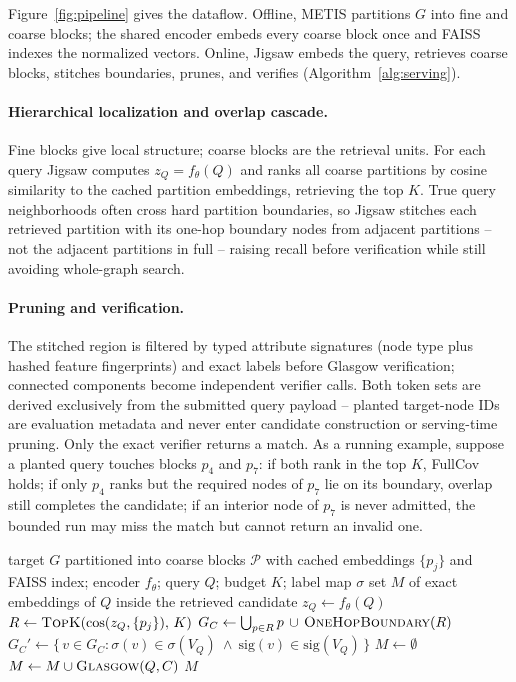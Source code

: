 \documentclass[sigconf, nonacm]{acmart}
\begin{document}
Figure~\ref{fig:pipeline} gives the dataflow. Offline, METIS partitions $G$ into fine and coarse blocks; the shared encoder embeds every coarse block once and FAISS indexes the normalized vectors. Online, Jigsaw embeds the query, retrieves coarse blocks, stitches boundaries, prunes, and verifies (Algorithm~\ref{alg:serving}).

\paragraph{Hierarchical localization and overlap cascade.}
Fine blocks give local structure; coarse blocks are the retrieval units. For each query Jigsaw computes $z_Q=f_\theta(Q)$ and ranks all coarse partitions by cosine similarity to the cached partition embeddings, retrieving the top $K$. True query neighborhoods often cross hard partition boundaries, so Jigsaw stitches each retrieved partition with its one-hop boundary nodes from adjacent partitions -- not the adjacent partitions in full -- raising recall before verification while still avoiding whole-graph search.

\paragraph{Pruning and verification.}
The stitched region is filtered by typed attribute signatures (node type plus hashed feature fingerprints) and exact labels before Glasgow verification; connected components become independent verifier calls. Both token sets are derived exclusively from the submitted query payload -- planted target-node IDs are evaluation metadata and never enter candidate construction or serving-time pruning. Only the exact verifier returns a match. As a running example, suppose a planted query touches blocks $p_4$ and $p_7$: if both rank in the top $K$, FullCov holds; if only $p_4$ ranks but the required nodes of $p_7$ lie on its boundary, overlap still completes the candidate; if an interior node of $p_7$ is never admitted, the bounded run may miss the match but cannot return an invalid one.

\begin{algorithm}[t]
\caption{Jigsaw online serving (one query)}
\label{alg:serving}
\begin{algorithmic}[1]
\Require target $G$ partitioned into coarse blocks $\mathcal{P}$ with cached embeddings $\{p_j\}$ and FAISS index; encoder $f_\theta$; query $Q$; budget $K$; label map $\sigma$
\Ensure set $M$ of exact embeddings of $Q$ inside the retrieved candidate
\State $z_Q \gets f_\theta(Q)$ 
\State $R \gets \textsc{TopK}(\mathrm{cos}(z_Q,\{p_j\}),\,K)$ 
\State $G_C \gets \bigcup_{p\in R} p \,\cup\, \textsc{OneHopBoundary}(R)$ 
\State $G_C' \gets \{\,v\in G_C : \sigma(v)\in\sigma(V_Q)\ \wedge\ \mathrm{sig}(v)\in\mathrm{sig}(V_Q)\,\}$ 
\State $M \gets \emptyset$
  \State $M \gets M \cup \textsc{Glasgow}(Q,C)$ 
\EndFor
\State \Return $M$
\end{algorithmic}
\end{algorithm}
\end{document}
